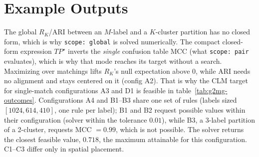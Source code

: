 \documentclass[a4paper,12pt]{article}
\begin{document}
\newpage

\section{Example Outputs}
The global $R_K$/ARI between an $M$-label and a $K$-cluster partition has no closed form, which is why \texttt{scope: global} is solved numerically. The compact closed-form expression $TP^\star$ inverts the \emph{single} confusion table MCC (what \texttt{scope: pair} evaluates), which is why that mode reaches its target without a search. Maximizing over matchings lifts $R_K$'s null expectation above $0$, while ARI needs no alignment and stays centered on it (config A2). That is why the CLM target for single-match configurations A3 and D1 is feasible in table~\ref{tab:g2mg-outcomes}. Configurations A4 and B1--B3 share one set of rules (labels sized $[1024,614,410]$, one rule per label); B1 and B2 request possible values within their configuration (solver within the tolerance $0.01$), while B3, a 3-label partition of a 2-cluster, requests $\mathrm{MCC}$ $=0.99$, which is not possible. The solver returns the closest feasible value, $0.718$, the maximum attainable for this configuration. C1--C3 differ only in spatial placement.
\end{document}
